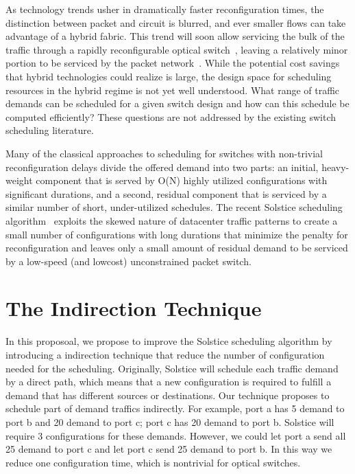 As technology trends usher in dramatically faster reconfiguration times,
the distinction between packet and circuit is blurred, and ever smaller
flows can take advantage of a hybrid fabric. This trend will soon allow
servicing the bulk of the traffic through a rapidly reconfigurable
optical switch~\cite{Porter:2013}, leaving a relatively minor portion to
be serviced by the packet network~\cite{Liu:2014}. While the potential
cost savings that hybrid technologies could realize is large, the design
space for scheduling resources in the hybrid regime is not yet well
understood. What range of traffic demands can be scheduled for a given
switch design and how can this schedule be computed efficiently? These
questions are not addressed by the existing switch scheduling literature.

Many of the classical approaches to scheduling for switches with
non-trivial reconfiguration delays divide the offered demand into two
parts: an initial, heavy-weight component that is served by O(N) highly
utilized configurations with significant durations, and a second,
residual component that is serviced by a similar number of short,
under-utilized schedules. The recent Solstice scheduling algorithm~\cite{Liu:2015}
exploits the skewed nature of datacenter traffic
patterns to create a small number of configurations with long durations
that minimize the penalty for reconfiguration and leaves only a small
amount of residual demand to be serviced by a low-speed (and lowcost)
unconstrained packet switch.

\section{The Indirection Technique}
\label{sec:indirection}
In this proposoal, we propose to improve the Solstice scheduling
algorithm by introducing a indirection technique that reduce the number
of configuration needed for the scheduling. Originally, Solstice will
schedule each traffic demand by a direct path, which means that a new
configuration is required to fulfill a demand that has different sources
or destinations. Our technique proposes to schedule part of demand traffics
indirectly. For example, port a has 5 demand to port b and 20
demand to port c; port c has 20 demand to port b. Solstice will require
3 configurations for these demands. However, we could let port a send
all 25 demand to port c and let port c send 25 demand to port b. In this
way we reduce one configuration time, which is nontrivial for optical
switches. 

